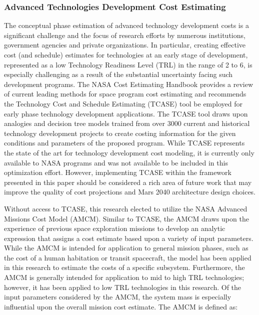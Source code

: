 \documentclass[]{aiaa-pretty}
\begin{document}
\subsubsection{Advanced Technologies Development Cost Estimating}
The conceptual phase estimation of advanced technology development costs is a significant challenge and the focus of research efforts by numerous institutions, government agencies and private organizations. In particular, creating effective cost (and schedule) estimates for technologies at an early stage of development, represented as a low Technology Readiness Level (TRL) in the range of 2 to 6, is especially challenging as a result of the substantial uncertainty facing such development programs. \cite{cole2013technology} The NASA Cost Estimating Handbook provides a review of current leading methods for space program cost estimating and recommends the Technology Cost and Schedule Estimating (TCASE) tool be employed for early phase technology development applications. \cite{nasa2015handbook} The TCASE tool draws upon analogies and decision tree models trained from over 3000 current and historical technology development projects to create costing information for the given conditions and parameters of the proposed program. While TCASE represents the state of the art for technology development cost modeling, it is currently only available to NASA programs and was not available to be included in this optimization effort. However, implementing TCASE within the framework presented in this paper should be considered a rich area of future work that may improve the quality of cost projections and Mars 2040 architecture design choices. 

Without access to TCASE, this research elected to utilize the NASA Advanced Missions Cost Model (AMCM). Similar to TCASE, the AMCM draws upon the experience of previous space exploration missions to develop an analytic expression that assigns a cost estimate based upon a variety of input parameters. While the AMCM is intended for application to general mission phases, such as the cost of a human habitation or transit spacecraft, the model has been applied in this research to estimate the costs of a specific subsystem. Furthermore, the AMCM is generally intended for application to mid to high TRL technologies; however, it has been applied to low TRL technologies in this research. \cite{jones2015estimating} Of the input parameters considered by the AMCM, the system mass is especially influential upon the overall mission cost estimate. The AMCM is defined as: \cite{larson1999human}
\end{document}
